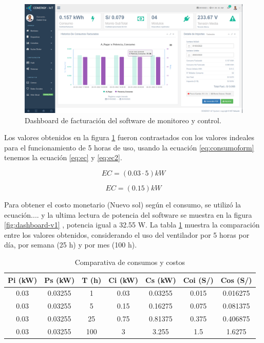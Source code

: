 \begin{landscape} %
\begin{figure}[htpb]
\centering 
\includegraphics[width=1.7\textwidth]{./Figures/test/consumo/consumo.png}
\caption{Dashboard de facturación del software de monitoreo y control.}
\label{fig:dashboard-consumo}
\end{figure}
\end{landscape} %

Los valores obtenidos en la figura \ref{fig:dashboard-consumo} fueron contrastados con los valores indeales para el funcionamiento de 5 horas de uso, usando la ecuación \ref{eq:consumoform} tenemos la ecuación \ref{eq:ec} y \ref{eq:ec2}. 

\begin{equation}
	\label{eq:ec}
	EC = \left( 0.03 \cdot 5 \right) kW
\end{equation}

\begin{equation}
	\label{eq:ec2}
	EC = \left( 0.15 \right) kW
\end{equation}

Para obtener el costo monetario (Nuevo sol) según el consumo, se utilizó la ecuación.... y la ultima lectura de potencia del software se muestra en la figura \ref{fig:dashboard-v1} , potencia igual a 32.55 W. La tabla \ref{tab:tablacostos} muestra la comparación entre los valores obtenidos, considerando el uso del ventilador por 5 horas por día, por semana (25 h) y por mes (100 h).

\begin{table}[h]
	\centering
	\caption[Comparativa de consumos y costos]{Comparativa de consumos y costos}
	\begin{tabular}{c c c c c c c}    
		\toprule
		\textbf{Pi (kW)} 	 & \textbf{Ps (kW)}  & \textbf{T (h)} &\textbf{Ci (kW)} &\textbf{Cs (kW)} &\textbf{Coi (S/)} &\textbf{Cos (S/)}\\
		\midrule
		0.03 & 0.03255 & 1 & 0.03 & 0.03255 & 0.015 & 0.016275\\		
		0.03 & 0.03255 & 5 & 0.15 & 0.16275 & 0.075 & 0.081375 \\
		0.03 & 0.03255 & 25 & 0.75 & 0.81375 & 0.375 & 0.406875\\		
		0.03 & 0.03255 & 100 & 3 & 3.255 & 1.5 & 1.6275\\		
		
		\bottomrule
		\hline
	\end{tabular}
	\label{tab:tablacostos}
\end{table}

